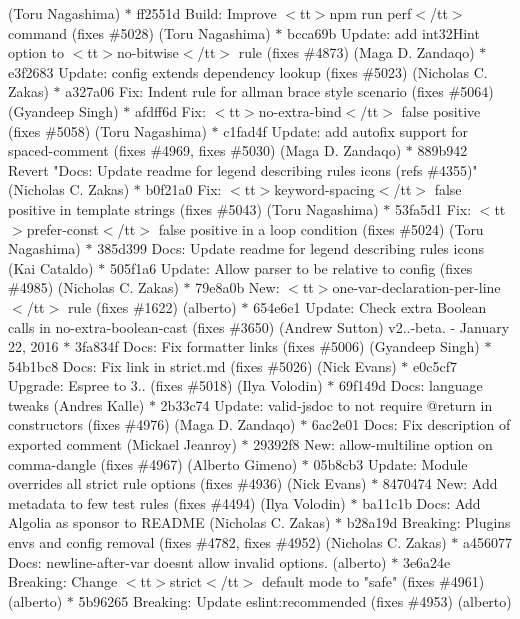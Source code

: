 \begin{DoxyItemize}
(\+Toru Nagashima) \texorpdfstring{$\ast$}{*} ff2551d Build\+: Improve $<$tt$>$npm run perf$<$/tt$>$ command (fixes \#5028) (\+Toru Nagashima) \texorpdfstring{$\ast$}{*} bcca69b Update\+: add int32\+Hint option to $<$tt$>$no-\/bitwise$<$/tt$>$ rule (fixes \#4873) (\+Maga D. Zandaqo) \texorpdfstring{$\ast$}{*} e3f2683 Update\+: config extends dependency lookup (fixes \#5023) (\+Nicholas C. Zakas) \texorpdfstring{$\ast$}{*} a327a06 Fix\+: Indent rule for allman brace style scenario (fixes \#5064) (\+Gyandeep Singh) \texorpdfstring{$\ast$}{*} afdff6d Fix\+: $<$tt$>$no-\/extra-\/bind$<$/tt$>$ false positive (fixes \#5058) (\+Toru Nagashima) \texorpdfstring{$\ast$}{*} c1fad4f Update\+: add autofix support for spaced-\/comment (fixes \#4969, fixes \#5030) (\+Maga D. Zandaqo) \texorpdfstring{$\ast$}{*} 889b942 Revert "{}Docs\+: Update readme for legend describing rules icons (refs \#4355)"{} (\+Nicholas C. Zakas) \texorpdfstring{$\ast$}{*} b0f21a0 Fix\+: $<$tt$>$keyword-\/spacing$<$/tt$>$ false positive in template strings (fixes \#5043) (\+Toru Nagashima) \texorpdfstring{$\ast$}{*} 53fa5d1 Fix\+: $<$tt$>$prefer-\/const$<$/tt$>$ false positive in a loop condition (fixes \#5024) (\+Toru Nagashima) \texorpdfstring{$\ast$}{*} 385d399 Docs\+: Update readme for legend describing rules icons (\+Kai Cataldo) \texorpdfstring{$\ast$}{*} 505f1a6 Update\+: Allow parser to be relative to config (fixes \#4985) (\+Nicholas C. Zakas) \texorpdfstring{$\ast$}{*} 79e8a0b New\+: $<$tt$>$one-\/var-\/declaration-\/per-\/line$<$/tt$>$ rule (fixes \#1622) (alberto) \texorpdfstring{$\ast$}{*} 654e6e1 Update\+: Check extra Boolean calls in no-\/extra-\/boolean-\/cast (fixes \#3650) (\+Andrew Sutton)  v2..-\/beta. -\/ January 22, 2016  \texorpdfstring{$\ast$}{*} 3fa834f Docs\+: Fix formatter links (fixes \#5006) (\+Gyandeep Singh) \texorpdfstring{$\ast$}{*} 54b1bc8 Docs\+: Fix link in strict.\+md (fixes \#5026) (\+Nick Evans) \texorpdfstring{$\ast$}{*} e0c5cf7 Upgrade\+: Espree to 3.. (fixes \#5018) (\+Ilya Volodin) \texorpdfstring{$\ast$}{*} 69f149d Docs\+: language tweaks (\+Andres Kalle) \texorpdfstring{$\ast$}{*} 2b33c74 Update\+: valid-\/jsdoc to not require @return in constructors (fixes \#4976) (\+Maga D. Zandaqo) \texorpdfstring{$\ast$}{*} 6ac2e01 Docs\+: Fix description of exported comment (\+Mickael Jeanroy) \texorpdfstring{$\ast$}{*} 29392f8 New\+: allow-\/multiline option on comma-\/dangle (fixes \#4967) (\+Alberto Gimeno) \texorpdfstring{$\ast$}{*} 05b8cb3 Update\+: Module overrides all \textquotesingle{}strict\textquotesingle{} rule options (fixes \#4936) (\+Nick Evans) \texorpdfstring{$\ast$}{*} 8470474 New\+: Add metadata to few test rules (fixes \#4494) (\+Ilya Volodin) \texorpdfstring{$\ast$}{*} ba11c1b Docs\+: Add Algolia as sponsor to README (\+Nicholas C. Zakas) \texorpdfstring{$\ast$}{*} b28a19d Breaking\+: Plugins envs and config removal (fixes \#4782, fixes \#4952) (\+Nicholas C. Zakas) \texorpdfstring{$\ast$}{*} a456077 Docs\+: newline-\/after-\/var doesn\textquotesingle{}t allow invalid options. (alberto) \texorpdfstring{$\ast$}{*} 3e6a24e Breaking\+: Change $<$tt$>$strict$<$/tt$>$ default mode to "{}safe"{} (fixes \#4961) (alberto) \texorpdfstring{$\ast$}{*} 5b96265 Breaking\+: Update eslint\+:recommended (fixes \#4953) (alberto) 
\end{DoxyItemize}
